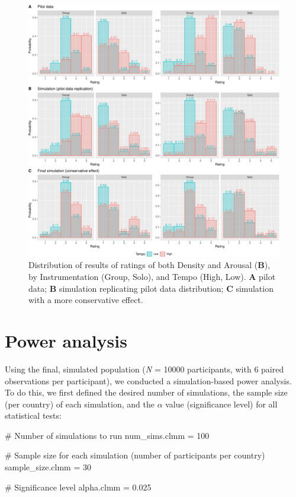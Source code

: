 \documentclass[
  bookmarksnumbered]{article}
\newenvironment{Shaded}{\begin{snugshade}}{\end{snugshade}}
\newcommand{\CommentTok}[1]{\textcolor[rgb]{0.50,0.62,0.50}{#1}}
\newcommand{\DecValTok}[1]{\textcolor[rgb]{0.86,0.86,0.80}{#1}}
\newcommand{\FloatTok}[1]{\textcolor[rgb]{0.75,0.75,0.82}{#1}}
\newcommand{\NormalTok}[1]{\textcolor[rgb]{0.80,0.80,0.80}{#1}}
\newcommand{\OtherTok}[1]{\textcolor[rgb]{0.94,0.94,0.56}{#1}}
\begin{document}
\begin{figure}
\centering
\includegraphics{Power_analysis_files/figure-latex/unnamed-chunk-12-1.pdf}
\caption{\label{fig:unnamed-chunk-12}Distribution of results of ratings of both Density and Arousal (\textbf{B}), by Instrumentation (Group, Solo), and Tempo (High, Low). \textbf{A} pilot data; \textbf{B} simulation replicating pilot data distribution; \textbf{C} simulation with a more conservative effect.}
\end{figure}

\hypertarget{power-analysis}{%
\section{Power analysis}\label{power-analysis}}

Using the final, simulated population (\emph{N} = 10000 participants, with 6 paired observations per participant), we conducted a simulation-based power analysis. To do this, we first defined the desired number of simulations, the sample size (per country) of each simulation, and the \(\alpha\) value (significance level) for all statistical tests:

\begin{Shaded}
\begin{Highlighting}[]
\CommentTok{\# Number of simulations to run}
\NormalTok{num\_sims.clmm }\OtherTok{=} \DecValTok{100} 

\CommentTok{\# Sample size for each simulation (number of participants per country)}
\NormalTok{sample\_size.clmm }\OtherTok{=} \DecValTok{30} 

\CommentTok{\# Significance level}
\NormalTok{alpha.clmm }\OtherTok{=} \FloatTok{0.025}
\end{Highlighting}
\end{Shaded}
\end{document}
